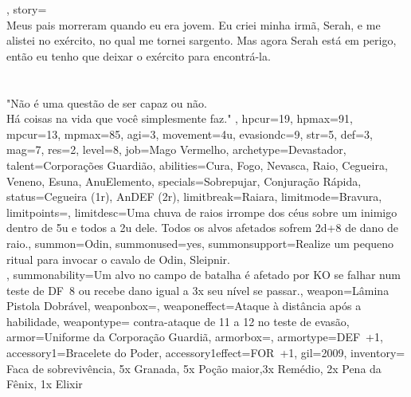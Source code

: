 {{\begin{multicols}{2}
		\end{multicols}
		\vspace*{-0.9cm}
	},
	story={\\
		Meus pais morreram quando eu era jovem.
		Eu criei minha irmã, Serah, e me alistei no exército, no qual me tornei sargento.
		Mas agora Serah está em perigo, então eu tenho que deixar o exército para encontrá-la. \\\\\\
		"Não é uma questão de ser capaz ou não.\\Há coisas na vida que você simplesmente faz."
	},
	hpcur=19, hpmax=91, mpcur=13, mpmax=85, agi=3, movement=4u, evasiondc=9, str=5, def=3, mag=7, res=2, 
	level=8, job=Mago Vermelho, archetype=Devastador\phantom{1234567}, talent=Corporações Guardião,
	abilities={Cura, Fogo, Nevasca, Raio, Cegueira,\\ Veneno, Esuna, AnuElemento},
	specials={Sobrepujar, Conjuração Rápida}, status={Cegueira (1r), AnDEF (2r)},
	limitbreak=Raiara, limitmode=Bravura, limitpoints=\ofcslimitbarfilled, 
	limitdesc={Uma chuva de raios irrompe dos céus sobre um inimigo dentro de 5u e todos a 2u dele. Todos os alvos afetados sofrem 2d+8 de dano de raio.},
	summon=Odin, summonused=yes, summonsupport={Realize um pequeno ritual para invocar o cavalo de Odin, Sleipnir.\\}, summonability={Um alvo no campo de batalha é afetado por KO se falhar num teste de DF~8 ou recebe dano igual a 3x seu nível se passar.},
	weapon=Lâmina Pistola Dobrável, weaponbox=\ofcsweaponboxexpert, weaponeffect=Ataque à distância após a habilidade, weapontype= contra-ataque de 11 a 12 no teste de evasão, armor=Uniforme da Corporação Guardiã, armorbox=\ofcsarmorboxbeginner, armortype=DEF~+1, accessory1=Bracelete do Poder, accessory1effect=FOR~+1,
	gil=2009, inventory={\\Faca de sobrevivência, 5x Granada, 5x Poção maior,\newline3x Remédio, 2x Pena da Fênix, 1x Elixir}
}
%
\clearpage
